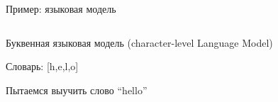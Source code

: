 \documentclass[notes,12pt, aspectratio=169]{beamer}
\newenvironment{wideitemize}{\itemize\addtolength{\itemsep}{10pt}}{\enditemize}
\begin{document}
\begin{frame}{Пример: языковая модель}
		\begin{columns}
		\begin{column}{.4\linewidth}
			\begin{wideitemize} 
				\item  Буквенная языковая модель (character-level Language Model)
				\item Словарь:  [h,e,l,o]
				\item Пытаемся выучить слово “hello”
			\end{wideitemize}
		\end{column}	
		\begin{column}{.7\linewidth}			
		\begin{center}

\end{center}
\end{column}
\end{columns}
\end{frame}
\end{document}
